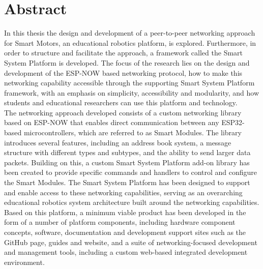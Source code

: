 \chapter*{Abstract}%
%
%
%

In this thesis the design and development of a peer-to-peer networking approach for Smart Motors, an educational robotics platform, is explored. Furthermore, in order to structure and facilitate the approach, a framework called the Smart System Platform is developed. The focus of the research lies on the design and development of the ESP-NOW based networking protocol, how to make this networking capability accessible through the supporting Smart System Platform framework, with an emphasis on simplicity, accessibility and modularity, and how students and educational researchers can use this platform and technology. \\

The networking approach developed consists of a custom networking library based on ESP-NOW that enables direct communication between any ESP32-based microcontrollers, which are referred to as Smart Modules. The library introduces several features, including an address book system, a message structure with different types and subtypes, and the ability to send larger data packets. Building on this, a custom Smart System Platform add-on library has been created to provide specific commands and handlers to control and configure the Smart Modules. 
The Smart System Platform has been designed to support and enable access to these networking capabilities, serving as an overarching educational robotics system architecture built around the networking capabilities. Based on this platform, a minimum viable product has been developed in the form of a number of platform components, including hardware component concepts, software, documentation and development support sites such as the GitHub page, guides and website, and a suite of networking-focused development and management tools, including a custom web-based integrated development environment. \\

